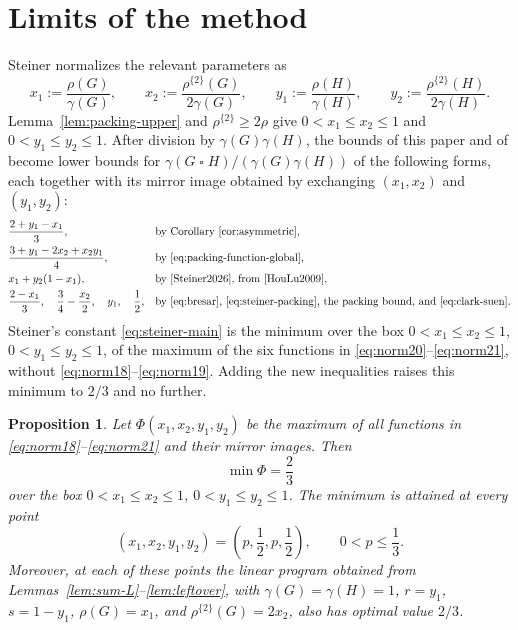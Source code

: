 \documentclass[10pt]{amsart}
\newtheorem{proposition}[theorem]{Proposition}
\theoremstyle{remark}
\newcommand{\rhoTwo}{\rho^{\{2\}}}
\begin{document}
\section{Limits of the method}\label{sec:limits}

Steiner \cite{Steiner2026} normalizes the relevant parameters as
\[
 x_1:=\frac{\rho(G)}{\gamma(G)},
 \qquad
 x_2:=\frac{\rhoTwo(G)}{2\gamma(G)},
 \qquad
 y_1:=\frac{\rho(H)}{\gamma(H)},
 \qquad
 y_2:=\frac{\rhoTwo(H)}{2\gamma(H)}.
\]
Lemma~\ref{lem:packing-upper} and $\rhoTwo\geq2\rho$ give
$0<x_1\leq x_2\leq1$ and $0<y_1\leq y_2\leq1$.
After division by $\gamma(G)\gamma(H)$, the bounds of this paper and of
\cite{Steiner2026} become lower bounds for
$\gamma(G\mathbin{\square}H)/(\gamma(G)\gamma(H))$ of the following forms,
each together with its mirror image obtained by exchanging
$(x_1,x_2)$ and $(y_1,y_2)$:
\begin{align}
 &\frac{2+y_1-x_1}{3},
 &&\text{by Corollary~\ref{cor:asymmetric}},
 \label{eq:norm18}\\
 &\frac{3+y_1-2x_2+x_2y_1}{4},
 &&\text{by \eqref{eq:packing-function-global}},
 \label{eq:norm19}\\
 &x_1+y_2(1-x_1),
 &&\text{by \cite[Corollary 3.3]{Steiner2026}, from \cite{HouLu2009}},
 \label{eq:norm20}\\
 &\frac{2-x_1}{3},\quad\frac34-\frac{x_2}{2},\quad y_1,\quad\frac12,
 &&\text{by \eqref{eq:bresar}, \eqref{eq:steiner-packing}, the packing bound,
 and \eqref{eq:clark-suen}}.
 \label{eq:norm21}
\end{align}
Steiner's constant \eqref{eq:steiner-main} is the minimum over the box
$0<x_1\leq x_2\leq1$, $0<y_1\leq y_2\leq1$, of the maximum of the six
functions in \eqref{eq:norm20}--\eqref{eq:norm21}, without
\eqref{eq:norm18}--\eqref{eq:norm19}. Adding the new inequalities raises this
minimum to $2/3$ and no further.

\begin{proposition}\label{prop:limits}
Let $\Phi(x_1,x_2,y_1,y_2)$ be the maximum of all functions in
\eqref{eq:norm18}--\eqref{eq:norm21} and their mirror images. Then
\[
 \min\Phi=\frac23
\]
over the box $0<x_1\leq x_2\leq1$, $0<y_1\leq y_2\leq1$. The minimum is
attained at every point
\[
 (x_1,x_2,y_1,y_2)=\left(p,\frac12,p,\frac12\right),
 \qquad 0<p\leq\frac13.
\]
Moreover, at each of these points the linear program obtained from
Lemmas~\ref{lem:sum-L}--\ref{lem:leftover}, with
$\gamma(G)=\gamma(H)=1$, $r=y_1$, $s=1-y_1$, $\rho(G)=x_1$, and
$\rhoTwo(G)=2x_2$, also has optimal value $2/3$.
\end{proposition}
\end{document}
